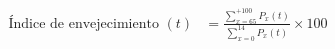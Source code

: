 \documentclass[12pt,a4paper]{article}
\begin{document}

\begin{align}
\text{Índice de envejecimiento }(t) &= \frac{\displaystyle\sum_{x=65}^{+100} P_x(t)}{\displaystyle\sum_{x=0}^{14} P_x(t)} \times 100 \\[10pt]
\end{align}








\end{document}
